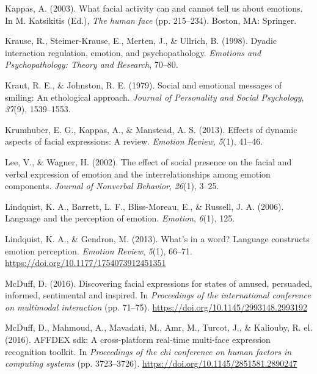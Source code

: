 \documentclass[man]{apa6}
\begin{document}
\leavevmode\hypertarget{ref-kappas2003facial}{}%
Kappas, A. (2003). What facial activity can and cannot tell us about emotions. In M. Katsikitis (Ed.), \emph{The human face} (pp. 215--234). Boston, MA: Springer.

\leavevmode\hypertarget{ref-krause1998dyadic}{}%
Krause, R., Steimer-Krause, E., Merten, J., \& Ullrich, B. (1998). Dyadic interaction regulation, emotion, and psychopathology. \emph{Emotions and Psychopathology: Theory and Research}, 70--80.

\leavevmode\hypertarget{ref-kraut1979social}{}%
Kraut, R. E., \& Johnston, R. E. (1979). Social and emotional messages of smiling: An ethological approach. \emph{Journal of Personality and Social Psychology}, \emph{37}(9), 1539--1553.

\leavevmode\hypertarget{ref-krumhuber2013effects}{}%
Krumhuber, E. G., Kappas, A., \& Manstead, A. S. (2013). Effects of dynamic aspects of facial expressions: A review. \emph{Emotion Review}, \emph{5}(1), 41--46.

\leavevmode\hypertarget{ref-lee2002effect}{}%
Lee, V., \& Wagner, H. (2002). The effect of social presence on the facial and verbal expression of emotion and the interrelationships among emotion components. \emph{Journal of Nonverbal Behavior}, \emph{26}(1), 3--25.

\leavevmode\hypertarget{ref-lindquist2006language}{}%
Lindquist, K. A., Barrett, L. F., Bliss-Moreau, E., \& Russell, J. A. (2006). Language and the perception of emotion. \emph{Emotion}, \emph{6}(1), 125.

\leavevmode\hypertarget{ref-lindquist2013s}{}%
Lindquist, K. A., \& Gendron, M. (2013). What's in a word? Language constructs emotion perception. \emph{Emotion Review}, \emph{5}(1), 66--71. \url{https://doi.org/10.1177/1754073912451351}

\leavevmode\hypertarget{ref-mcduff2016discovering}{}%
McDuff, D. (2016). Discovering facial expressions for states of amused, persuaded, informed, sentimental and inspired. In \emph{Proceedings of the international conference on multimodal interaction} (pp. 71--75). \url{https://doi.org/10.1145/2993148.2993192}

\leavevmode\hypertarget{ref-mcduff2016affdex}{}%
McDuff, D., Mahmoud, A., Mavadati, M., Amr, M., Turcot, J., \& Kaliouby, R. el. (2016). AFFDEX sdk: A cross-platform real-time multi-face expression recognition toolkit. In \emph{Proceedings of the chi conference on human factors in computing systems} (pp. 3723--3726). \url{https://doi.org/10.1145/2851581.2890247}
\end{document}
